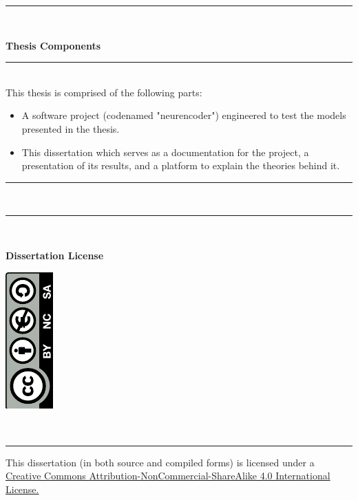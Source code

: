 \documentclass[a4paper, 12pt]{report}
\newenvironment{nscenter}
{\parskip=0.2cm\par\nopagebreak\centering}
{\parskip=0pt\par\noindent\ignorespacesafterend}
\begin{document}
\begin{titlepage}	
	\rule{\linewidth}{0.5mm} \\[0.1cm]
	\vspace{-0.1cm}
	\begin{minipage}{\textwidth}
		\Large{\textbf{Thesis Components}}
	\end{minipage}
	\rule{\linewidth}{0.2mm} \\[0.1cm]
	\noindent
		This thesis is comprised of the following parts:
		\begin{itemize}[nosep]
			\item A software project (codenamed "neurencoder") engineered to test the models presented in the thesis.
			\item This dissertation which serves as a documentation for the project, a presentation of its results, and a platform to explain the theories behind it.
		\end{itemize}	
		\vspace{-0.3cm}
	\rule{\linewidth}{0.2mm} \\[0.5cm]
	\noindent
	\rule{\linewidth}{0.5mm} \\[0.1cm]
	\begin{minipage}{0.5\textwidth}
		\Large{\textbf{Dissertation License}}
	\end{minipage}
	\begin{minipage}{0.5\textwidth}
		\begin{flushright}
			\includegraphics[angle=-90]{by-nc-sa}
		\end{flushright}
	\end{minipage}
	\\[0.1cm]
	\rule{\linewidth}{0.2mm}
	\vspace{-0.45cm}
	\begin{nscenter}
		This dissertation (in both source and compiled forms) is licensed under a\\
		\href{http://creativecommons.org/licenses/by-nc-sa/4.0/}{Creative Commons Attribution-NonCommercial-ShareAlike 4.0 International License.}

\end{nscenter}
\end{titlepage}
\end{document}
